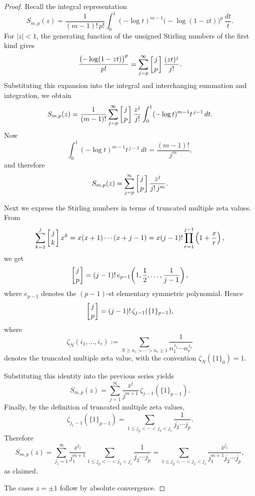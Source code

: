 \documentclass[10pt,reqno,a4paper]{amsart}%
\theoremstyle{definition}
\begin{document}
\begin{proof}
Recall the integral representation
\[
S_{m,p}(z)=\frac{1}{(m-1)!\,p!}\int_{0}^{1}(-\log t)^{m-1}\bigl(-\log
(1-zt)\bigr)^{p}\,\frac{dt}{t}.
\]
For $|z|<1$, the generating function of the unsigned Stirling numbers of the
first kind gives
\[
\frac{\bigl(-\log(1-zt)\bigr)^{p}}{p!}=\sum_{j=p}^{\infty}\left[  {%
\genfrac{}{}{0pt}{}{j}{p}%
}\right]  \frac{(zt)^{j}}{j!}.
\]
Substituting this expansion into the integral and interchanging summation and
integration, we obtain
\[
S_{m,p}(z)=\frac{1}{(m-1)!}\sum_{j=p}^{\infty}\left[  {%
\genfrac{}{}{0pt}{}{j}{p}%
}\right]  \frac{z^{j}}{j!}\int_{0}^{1}(-\log t)^{m-1}t^{\,j-1}\,dt.
\]
Now
\[
\int_{0}^{1}(-\log t)^{m-1}t^{\,j-1}\,dt=\frac{(m-1)!}{j^{m}},
\]
and therefore
\[
S_{m,p}(z)=\sum_{j=p}^{\infty}\left[  {%
\genfrac{}{}{0pt}{}{j}{p}%
}\right]  \frac{z^{j}}{j!\,j^{m}}.
\]


Next we express the Stirling numbers in terms of truncated multiple zeta
values. From
\[
\sum_{k=1}^{j}\left[  {%
\genfrac{}{}{0pt}{}{j}{k}%
}\right]  x^{k}=x(x+1)\cdots(x+j-1)=x(j-1)!\prod_{r=1}^{j-1}\left(  1+\frac
{x}{r}\right)  ,
\]
we get
\[
\left[  {%
\genfrac{}{}{0pt}{}{j}{p}%
}\right]  =(j-1)!\,e_{p-1}\!\left(  1,\frac{1}{2},\dots,\frac{1}{j-1}\right)
,
\]
where $e_{p-1}$ denotes the $(p-1)$-st elementary symmetric polynomial. Hence
\[
\left[  {%
\genfrac{}{}{0pt}{}{j}{p}%
}\right]  =(j-1)!\,\zeta_{j-1}(\{1\}_{p-1}),
\]
where
\[
\zeta_{N}(i_{1},\dots,i_{r}):=\sum_{N\geq n_{1}>\cdots>n_{r}\geq1}\frac
{1}{n_{1}^{\,i_{1}}\cdots n_{r}^{\,i_{r}}}%
\]
denotes the truncated multiple zeta value, with the convention $\zeta
_{N}(\{1\}_{0})=1$.

Substituting this identity into the previous series yields
\[
S_{m,p}(z) =\sum_{j=1}^{\infty}\frac{z^{j}}{j^{m+1}}\, \zeta_{j-1}
(\{1\}_{p-1}).
\]
Finally, by the definition of truncated multiple zeta values,
\[
\zeta_{j_{1}-1}(\{1\}_{p-1}) =\sum_{1\le j_{p}<\cdots<j_{2}<j_{1}}\frac
{1}{j_{2}\cdots j_{p}}.
\]
Therefore
\[
S_{m,p}(z) =\sum_{j_{1}=1}^{\infty}\frac{z^{j_{1}}}{j_{1}^{m+1}} \sum_{1\le
j_{p}<\cdots<j_{2}<j_{1}}\frac{1}{j_{2}\cdots j_{p}} =\sum_{1\le j_{p}
<\cdots<j_{2}<j_{1}} \frac{z^{j_{1}}}{j_{1}^{m+1}j_{2}\cdots j_{p}},
\]
as claimed.

The cases $z=\pm1$ follow by absolute convergence.
\end{proof}
\end{document}
